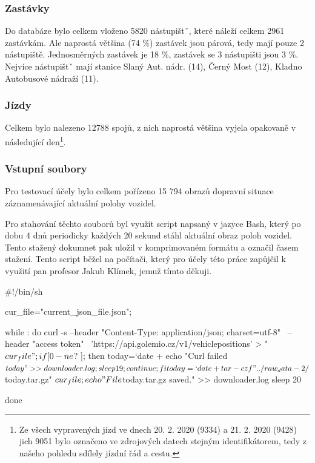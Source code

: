 \subsubsection{Zastávky} \label{subsubsection:zastavky}

Do databáze bylo celkem vloženo 5820 nástupištˇ, které náleží celkem 2961 zastávkám. Ale naprostá většina (74 \%) zastávek jsou párová, tedy mají pouze 2 nástupiště. Jednosměrných zastávek je 18 \%, zastávek se 3 nástupišti jsou 3 \%. Nejvíce nástupištˇ mají stanice Slaný Aut. nádr. (14), Černý Most (12), Kladno Autobusové nádraží (11).

\subsubsection{Jízdy}

Celkem bylo nalezeno 12788 spojů, z nich naprostá většina vyjela opakovaně v následující den\footnote{Ze všech vypravených jízd ve dnech 20. 2. 2020 (9334) a 21. 2. 2020 (9428) jich 9051 bylo označeno ve zdrojových datech stejným identifikátorem, tedy z našeho pohledu sdílely jízdní řád a cestu.}.

\subsubsection{Vstupní soubory} \label{subsubsection:vstupni_soubory}

Pro testovací účely bylo celkem pořízeno 15 794 obrazů dopravní situace záznamenávající aktuální polohy vozidel.

\bigbreak

Pro stahování těchto souborů byl využit script napsaný v jazyce Bash, který po dobu 4 dnů periodicky každých 20 sekund stáhl aktuální obraz poloh vozidel. Tento stažený dokumnet pak uložil v komprimovaném formátu a označil časem stažení. Tento script běžel na počítači, který pro účely této práce zapůjčil k využití pan profesor Jakub Klímek, jemuž tímto děkuji.

\begin{code}[frame=none]
#!/bin/sh

cur_file="current_json_file.json";

while :
do
  curl -s --header "Content-Type: application/json; charset=utf-8" \
  --header "access token" \
  'https://api.golemio.cz/v1/vehiclepositions' > "$cur_file";

  if [ 0 -ne $? ];
  then
    today=`date +%
    echo "Curl failed $today" >> downloader.log;
    sleep 19;
    continue;
  fi

  today=`date +%
  tar -czf "../raw_data-2/${today}.tar.gz" $cur_file;
  echo "File ${today}.tar.gz saved." >> downloader.log
  sleep 20

done

\end{code}

